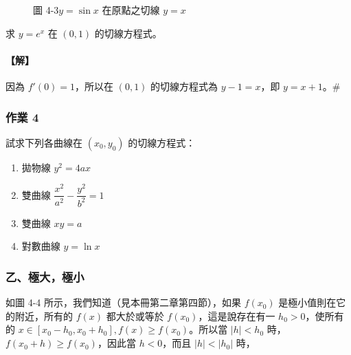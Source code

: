 \begin{figure}[H]
\centering
{}
\caption{圖 4-3\quad $y=\sin x$ 在原點之切線 $y=x$}
\label{fig:b6-app4-sin-tangent}
\end{figure}

\begin{example}\label{ex:b6-app4-20}
求 $y=e^x$ 在 $(0,1)$ 的切線方程式。
\end{example}

\paragraph{【解】}
因為 $f'(0)=1$，所以在 $(0,1)$ 的切線方程式為 $y-1=x$，即 $y=x+1$。\hfill$\#$

\subsubsection*{作業 4}
試求下列各曲線在 $(x_0, y_0)$ 的切線方程式：
\begin{enumerate}[label=(\roman*), leftmargin=2em]
  \item 拋物線 $y^2 = 4ax$
  \item 雙曲線 $\dfrac{x^2}{a^2} - \dfrac{y^2}{b^2} = 1$
  \item 雙曲線 $xy = a$
  \item 對數曲線 $y = \ln x$
\end{enumerate}

\subsubsection*{乙、極大，極小}

如圖 4-4 所示，我們知道（見本冊第二章第四節），如果 $f(x_0)$ 是極小值則在它的附近，所有的 $f(x)$ 都大於或等於 $f(x_0)$，這是說存在有一 $h_0>0$，使所有的 $x\in[x_0-h_0, x_0+h_0], f(x)\ge f(x_0)$。所以當 $|h|<h_0$ 時，$f(x_0+h)\ge f(x_0)$，因此當 $h<0$，而且 $|h|<|h_0|$ 時，

